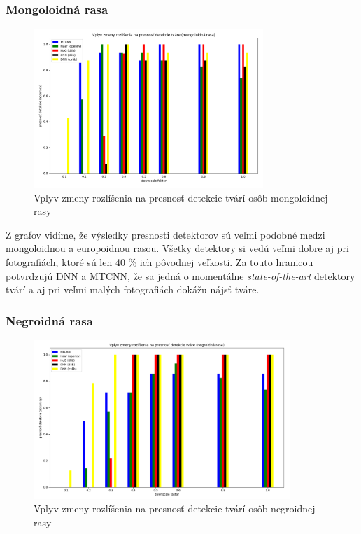 \documentclass[]{article}
\begin{document}
	
	\newpage
	\subsubsection*{Mongoloidná rasa}
	\begin{figure}[h!]
		\includegraphics[height=6cm,width=\textwidth]{Vysledky_rozslisenie/mongo/Figure_1.png}
		\caption{Vplyv zmeny rozlíšenia na presnosť detekcie tvárí osôb mongoloidnej rasy}
	\end{figure}

	Z grafov vidíme, že výsledky presnosti detektorov sú veľmi podobné medzi mongoloidnou a europoidnou rasou. Všetky detektory si vedú veľmi dobre aj pri fotografiách, ktoré sú len 40 \% ich pôvodnej veľkosti. Za touto hranicou potvrdzujú DNN a MTCNN, že sa jedná o momentálne \textit{state-of-the-art} detektory tvárí a aj pri veľmi malých fotografiách dokážu nájsť tváre.

	\subsubsection*{Negroidná rasa}
	\begin{figure}[h!]
		\includegraphics[height=6cm,width=\textwidth]{Vysledky_rozslisenie/negro/Figure_1.png}
		\caption{Vplyv zmeny rozlíšenia na presnosť detekcie tvárí osôb negroidnej rasy}
	\end{figure}
\end{document}
